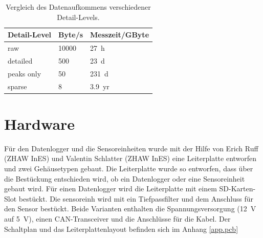 \begin{table}
\begin{center}
\begin{tabular}{|l|l|l|}
\hline \textbf{Detail-Level} & \textbf{Byte/s} & Messzeit/GByte\\ 
\hline raw                   & 10000 & 27~h \\
\hline detailed              &   500 & 23~d \\
\hline peaks only            &    50 & 231~d \\
\hline sparse                &     8 & 3.9~yr \\
\hline 
\end{tabular}
\caption{Vergleich des Datenaufkommens verschiedener Detail-Levels.}
\label{table.datarate}
\end{center}
\end{table} 

\section{Hardware}
Für den Datenlogger und die Sensoreinheiten wurde mit der Hilfe von Erich Ruff (ZHAW InES) und Valentin Schlatter (ZHAW InES) eine Leiterplatte entworfen und zwei Gehäusetypen gebaut. Die Leiterplatte wurde so entworfen, dass über die Bestückung entschieden wird, ob ein Datenlogger oder eine Sensoreinheit gebaut wird. Für einen Datenlogger wird die Leiterplatte mit einem SD-Karten-Slot bestückt. Die \gls{sensoreinh} wird mit ein Tiefpassfilter und dem Anschluss für den Sensor bestückt. Beide Varianten enthalten die Spannungsversorgung (12~V auf 5~V), einen CAN-Transceiver und die Anschlüsse für die Kabel. Der Schaltplan und das Leiterplattenlayout befinden sich im Anhang \ref{app.pcb}